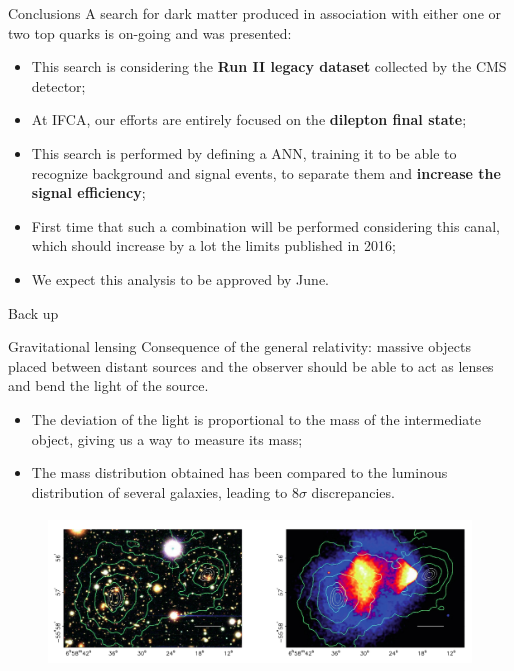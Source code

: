 \documentclass[8pt]{beamer}
\newcommand{\backupbegin}{
   \newcounter{finalframe}
   \setcounter{finalframe}{\value{framenumber}}
}
\begin{document}
\begin{frame}{Conclusions}
\justifying
A search for \alert{dark matter produced in association with either one or two top quarks} is on-going and was presented:

\begin{itemize}
\justifying
\item This search is considering the \textbf{Run II legacy dataset} collected by the CMS detector;
\item At IFCA, our efforts are entirely focused on the \textbf{dilepton final state};
\item This search is performed by defining a ANN, training it to be able to recognize background and signal events, to separate them and \textbf{increase the signal efficiency};
\item First time that such a combination will be performed considering this canal, which should increase by a lot the limits published in 2016; 
\item We expect this analysis \alert{to be approved by June}.
\end{itemize}
\end{frame}


\backupbegin

\begin{frame}[standout]
Back up
\end{frame}

\begin{frame}{Gravitational lensing}
\justifying
\vspace{5pt}
Consequence of the general relativity: massive objects placed between distant sources and the observer should be able to act as lenses and bend the light of the source. \vfill

\begin{itemize}
\justifying
\item The deviation of the light is proportional to the mass of the intermediate object, giving us a way to measure its mass;
\item The mass distribution obtained has been compared to the luminous distribution of several galaxies, leading to $8\sigma$ discrepancies. %
\end{itemize} \vfill

\vspace{-5pt}
\begin{figure}[htbp]
\begin{center}
\includegraphics[width=11	cm, height=4cm]{figs/BulletCluster.png}
\end{center}
\end{figure} \vfill
\end{frame}
\end{document}
